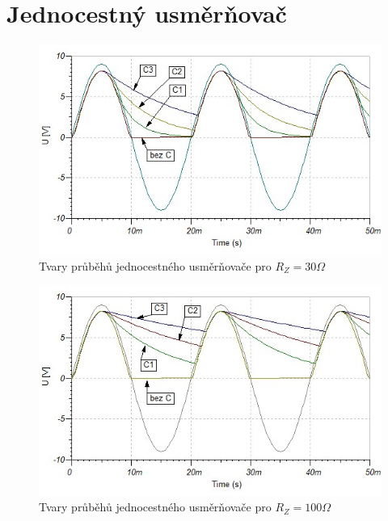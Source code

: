 \documentclass[12pt]{article} %
\begin{document}
\section{Jednocestný usměrňovač}
\begin{figure}[H]
\center
\includegraphics[scale=0.7]{jednocestny30.jpg}
\caption{Tvary průběhů jednocestného usměrňovače pro $R_Z = 30\Omega$}
\end{figure}

\begin{figure}[H]
\center
\includegraphics[scale=0.7]{jednocestny100.jpg}
\caption{Tvary průběhů jednocestného usměrňovače pro $R_Z = 100\Omega$}
\end{figure}
\end{document}
